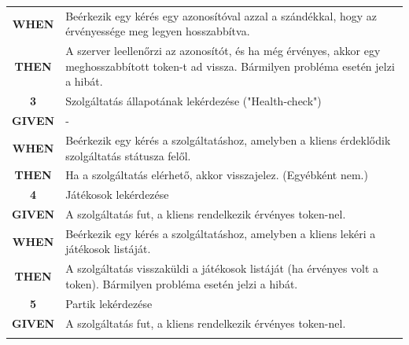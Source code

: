 \documentclass[twoside, a4paper, 12pt]{book}
\begin{document}
\begin{longtable}[c]{|c|p{14cm}|}
	\textbf{WHEN} &
	Beérkezik egy kérés egy azonosítóval azzal a szándékkal, hogy az érvényessége meg legyen hosszabbítva.
	\\
	\nobreakhline
	
	\textbf{THEN} &
	A szerver leellenőrzi az azonosítót, és ha még érvényes, akkor egy meghosszabbított token-t ad vissza.
	Bármilyen probléma esetén jelzi a hibát.
	\\
	\hline
	
	
	\rowcolor[HTML]{CBCEFB} 
	\textbf{3}
	&	Szolgáltatás állapotának lekérdezése ("Health-check")
	\\ \nobreakhline
	
	\textbf{GIVEN} &
	-
	\\ \nobreakhline
	
	\textbf{WHEN} &
	Beérkezik egy kérés a szolgáltatáshoz, amelyben a kliens érdeklődik szolgáltatás státusza felől.
	\\
	\nobreakhline
	
	\textbf{THEN} &
	Ha a szolgáltatás elérhető, akkor visszajelez. (Egyébként nem.)
	\\
	\hline
	
	
	\rowcolor[HTML]{CBCEFB} 
	\textbf{4}
	&	Játékosok lekérdezése
	\\ \nobreakhline
	
	\textbf{GIVEN} &
	A szolgáltatás fut, a kliens rendelkezik érvényes token-nel.
	\\ \nobreakhline
	
	\textbf{WHEN} &
	Beérkezik egy kérés a szolgáltatáshoz, amelyben a kliens lekéri a játékosok listáját.
	\\
	\nobreakhline
	
	\textbf{THEN} &
	A szolgáltatás visszaküldi a játékosok listáját (ha érvényes volt a token).
	Bármilyen probléma esetén jelzi a hibát.
	\\
	\hline
	
	
	\rowcolor[HTML]{CBCEFB} 
	\textbf{5}
	&	Partik lekérdezése
	\\ \nobreakhline
	
	\textbf{GIVEN} &
	A szolgáltatás fut, a kliens rendelkezik érvényes token-nel.
	\\ \nobreakhline
	

\end{longtable}
\end{document}
